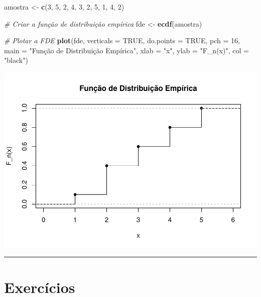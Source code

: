 \documentclass[
]{book}
\newenvironment{Shaded}{\begin{snugshade}}{\end{snugshade}}
\newcommand{\AttributeTok}[1]{\textcolor[rgb]{0.13,0.29,0.53}{#1}}
\newcommand{\CommentTok}[1]{\textcolor[rgb]{0.56,0.35,0.01}{\textit{#1}}}
\newcommand{\ConstantTok}[1]{\textcolor[rgb]{0.56,0.35,0.01}{#1}}
\newcommand{\DecValTok}[1]{\textcolor[rgb]{0.00,0.00,0.81}{#1}}
\newcommand{\FunctionTok}[1]{\textcolor[rgb]{0.13,0.29,0.53}{\textbf{#1}}}
\newcommand{\NormalTok}[1]{#1}
\newcommand{\OtherTok}[1]{\textcolor[rgb]{0.56,0.35,0.01}{#1}}
\newcommand{\StringTok}[1]{\textcolor[rgb]{0.31,0.60,0.02}{#1}}
\begin{document}
\begin{Shaded}
\begin{Highlighting}[]
\NormalTok{amostra }\OtherTok{\textless{}{-}} \FunctionTok{c}\NormalTok{(}\DecValTok{3}\NormalTok{, }\DecValTok{5}\NormalTok{, }\DecValTok{2}\NormalTok{, }\DecValTok{4}\NormalTok{, }\DecValTok{3}\NormalTok{, }\DecValTok{2}\NormalTok{, }\DecValTok{5}\NormalTok{, }\DecValTok{1}\NormalTok{, }\DecValTok{4}\NormalTok{, }\DecValTok{2}\NormalTok{)}

\CommentTok{\# Criar a função de distribuição empírica}
\NormalTok{fde }\OtherTok{\textless{}{-}} \FunctionTok{ecdf}\NormalTok{(amostra)}

\CommentTok{\# Plotar a FDE}
\FunctionTok{plot}\NormalTok{(fde, }\AttributeTok{verticals =} \ConstantTok{TRUE}\NormalTok{, }\AttributeTok{do.points =} \ConstantTok{TRUE}\NormalTok{, }\AttributeTok{pch =} \DecValTok{16}\NormalTok{,}
     \AttributeTok{main =} \StringTok{"Função de Distribuição Empírica"}\NormalTok{,}
     \AttributeTok{xlab =} \StringTok{"x"}\NormalTok{, }\AttributeTok{ylab =} \StringTok{"F\_n(x)"}\NormalTok{,}
     \AttributeTok{col =} \StringTok{"black"}\NormalTok{)}
\end{Highlighting}
\end{Shaded}

\begin{center}\includegraphics{AED_files/figure-latex/empirica-1} \end{center}

\begin{center}\rule{0.5\linewidth}{0.5pt}\end{center}

\section{Exercícios}\label{exercuxedcios-3}
\end{document}
